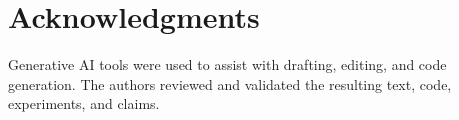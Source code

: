 \documentclass[sigplan,anonymous,nonacm]{acmart}
\begin{document}
\section*{Acknowledgments}
Generative AI tools were used to assist with drafting, editing, and code generation. The authors reviewed and validated the resulting text, code, experiments, and claims.



\end{document}
